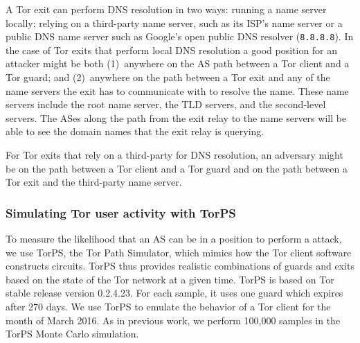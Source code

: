 A Tor exit can perform DNS resolution in two ways: running a name server
locally; relying on a third-party name server, such as its ISP's name
server or a public DNS name server such as Google's open public DNS
resolver ({\tt 8.8.8.8}).  In the case of Tor
exits that perform local DNS resolution a good position for an attacker
might be both (1)~anywhere on the AS path between a Tor client and a Tor
guard; and (2)~anywhere on the path between a Tor exit and any of the
name servers the exit has to communicate with to resolve the name.
These name servers include the root name server, the TLD servers, and
the second-level servers.  The ASes along the path from the exit relay
to the name servers will be able to see the domain names that the exit
relay is querying.

For Tor exits that rely on a third-party for DNS resolution, an
adversary might be on the path between a Tor client and a
Tor guard and on the path between a Tor exit and the third-party name
server.  

\subsubsection{Simulating Tor user activity with TorPS}

To measure the likelihood that an AS can be in a position to perform a
\name attack, we use TorPS, the Tor Path Simulator, which mimics how the
Tor client software constructs circuits.  TorPS thus provides realistic
combinations of guards and exits based on the state of the Tor network
at a given time. TorPS is based on Tor stable release version 0.2.4.23. 
For each sample, 
it uses one guard which expires after 270 days. We use TorPS to emulate
the behavior of a Tor client for the month of March 2016.  As in
previous work, we perform 100,000 samples in the TorPS Monte Carlo
simulation.  

